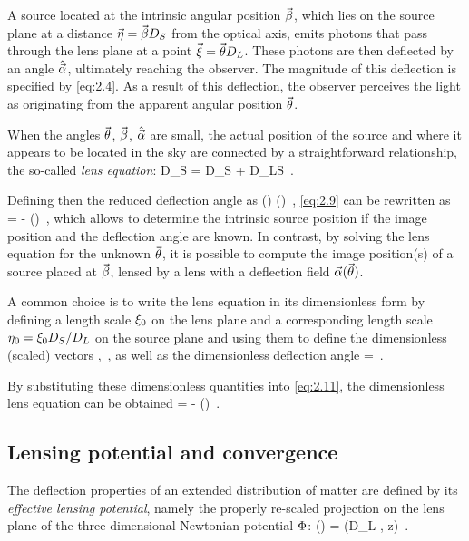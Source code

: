 A source located at the intrinsic angular position $\va{\beta}$, which lies on the source plane at a distance $\va{\eta} = \va{\beta} D_S$ from the optical axis, emits photons that pass through the lens plane at a point $\va{\xi} = \va{\theta} D_L$. These photons are then deflected by an angle $\hat{\va{\alpha}}$, ultimately reaching the observer. The magnitude of this deflection is specified by \cref{eq:2.4}.
As a result of this deflection, the observer perceives the light as originating from the apparent angular position $\va{\theta}$.

When the angles $\va{\theta}$, $\va{\beta}$, $\hat{\va{\alpha}}$ are small, the actual position of the source and where it appears to be located in the sky are connected by a straightforward relationship, the so-called \emph{lens equation}:
\be
\label{eq:2.9}
\va{\t} D_S = \va{\b} D_S + \hat{\va{\a}} D_{LS} \,.
\ee

Defining then the reduced deflection angle as
\be
\label{eq:2.10}
\va{\a} (\va{\t}) \equiv {} \hat{\va{\a}} (\va{\t}) \,,
\ee
\cref{eq:2.9} can be rewritten as
\be
\label{eq:2.11}
\va{\b} = \va{\t} - \va{\a} (\va{\t}) \,,
\ee
which allows to determine the intrinsic source position if the image position and the deflection angle are known. In contrast, by solving the lens equation for the unknown $\va{\theta}$, it is possible to compute the image position(s) of a source placed at $\va{\beta}$, lensed by a lens with a deflection field $\va{\alpha} (\va{\theta})$.

A common choice is to write the lens equation in its dimensionless form by defining a length scale $\xi_0$ on the lens plane and a corresponding length scale $\eta_0 = \xi_0 D_S / D_L$ on the source plane and using them to define the dimensionless (scaled) vectors
\be
\label{eq:2.12}
 \equiv {} \;,\quad {} \equiv {} \,,
\ee
as well as the dimensionless deflection angle
\be
\label{eq:2.13}
\va{\a}  =  \hat{\va{\a}}  \,.
\ee

By substituting these dimensionless quantities into \cref{eq:2.11}, the dimensionless lens equation can be obtained
\be
\label{eq:2.14}
 =  - \va{\a} () \,.
\ee


\subsection{Lensing potential and convergence}
\label{subsec:lensing_potential_convergence}
The deflection properties of an extended distribution of matter are defined by its \emph{effective lensing potential}, namely the properly re-scaled projection on the lens plane of the three-dimensional Newtonian potential $\Phi$:
\be
\label{eq:2.15}
\hat{\P} (\va{\t}) =   \int \F (D_L \va{\t}, z)  \,.
\ee

